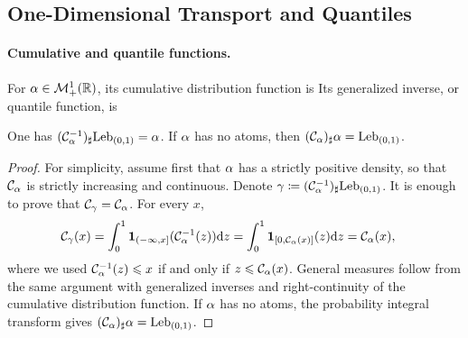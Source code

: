 \subsection{One-Dimensional Transport and Quantiles}
\label{sec-1d-transport-quantiles}
\paragraph{Cumulative and quantile functions.}
\begin{defn}\label{def-cdf-quantile}
For $\alpha\in\mathcal{M}_+^1(\mathbb{R})$, its cumulative distribution function is
\eql{\label{eq-cumul-defn}
\cumul{\al}(x)\eqdef\al((-\infty,x]).
}
Its generalized inverse, or quantile function, is
\end{defn}
\begin{prop}\label{prop-quantile-pushforward}
One has $(\mathcal{C}_{\alpha}^{-1})_\sharp\mathrm{Leb}_{(0,1)}=\alpha$. If $\alpha$ has no atoms, then $(\mathcal{C}_{\alpha})_\sharp\alpha=\mathrm{Leb}_{(0,1)}$.
\end{prop}
\begin{proof}
For simplicity, assume first that $\alpha$ has a strictly positive density, so that $\mathcal{C}_{\alpha}$ is strictly increasing and continuous. Denote $\gamma\coloneqq(\mathcal{C}_{\alpha}^{-1})_\sharp\mathrm{Leb}_{(0,1)}$. It is enough to prove that $\mathcal{C}_{\gamma}=\mathcal{C}_{\alpha}$. For every $x$,
\[
\begin{aligned}
\mathcal{C}_{\gamma}(x)
&=
\int_0^1 \mathbf 1_{(-\infty,x]}(\mathcal{C}_{\alpha}^{-1}(z))\mathrm{d} z
=
\int_0^1 \mathbf 1_{[0,\mathcal{C}_{\alpha}(x)]}(z)\mathrm{d} z
=
\mathcal{C}_{\alpha}(x),
\end{aligned}
\]
where we used $\mathcal{C}_{\alpha}^{-1}(z)\leqslant x$ if and only if $z\leqslant\mathcal{C}_{\alpha}(x)$. General measures follow from the same argument with generalized inverses and right-continuity of the cumulative distribution function. If $\alpha$ has no atoms, the probability integral transform gives $(\mathcal{C}_{\alpha})_\sharp\alpha=\mathrm{Leb}_{(0,1)}$.
\end{proof}

